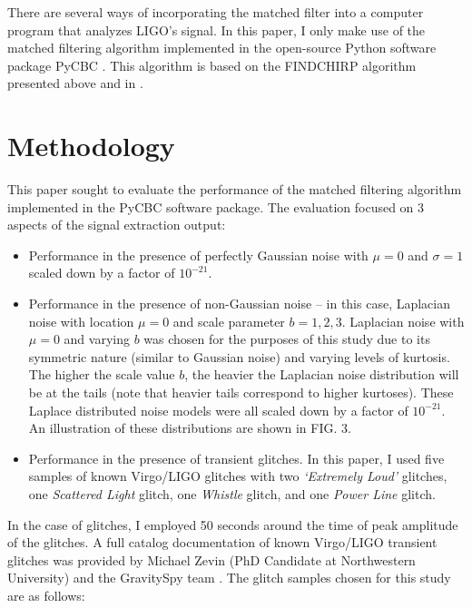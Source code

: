 \documentclass[preprint,
letterpaper,
 amsmath,amssymb,
 aps,
]{revtex4-2}
\begin{document}
There are several ways of incorporating the matched filter into a computer program that analyzes LIGO's signal. In this paper, I only make use of the matched filtering algorithm implemented in the open-source Python software package PyCBC \cite{pycbc}. This algorithm is based on the FINDCHIRP algorithm presented above and in \cite{findchirp}.


\section{Methodology}

This paper sought to evaluate the performance of the matched filtering algorithm implemented in the PyCBC software package. The evaluation focused on 3 aspects of the signal extraction output:
\begin{itemize}
    \item Performance in the presence of perfectly Gaussian noise with $\mu = 0$  and $\sigma = 1$ scaled down by a factor of $10^{-21}$.
    \item Performance in the presence of non-Gaussian noise – in this case, Laplacian noise with location $\mu = 0$ and scale parameter $b = 1,2,3$. Laplacian noise with  $\mu = 0$ and varying $b$ was chosen for the purposes of this study due to its symmetric nature (similar to Gaussian noise) and varying levels of kurtosis. The higher the scale value $b$, the heavier the Laplacian noise distribution will be at the tails (note that heavier tails correspond to higher kurtoses). These Laplace distributed noise models were all scaled down by a factor of $10^{-21}$. An illustration of these distributions are shown in FIG. 3.
    \item Performance in the presence of transient glitches. In this paper, I used five samples of known Virgo/LIGO glitches with two \textit{`Extremely Loud'} glitches, one \textit{Scattered Light} glitch, one \textit{Whistle} glitch, and one \textit{Power Line} glitch.

\end{itemize}

In the case of glitches, I employed 50 seconds around the time of peak amplitude of the glitches. A full catalog documentation of known Virgo/LIGO transient glitches was provided by Michael Zevin (PhD Candidate at Northwestern University) and the GravitySpy team \cite{gravityspy}.  The glitch samples chosen for this study are as follows:
\end{document}
